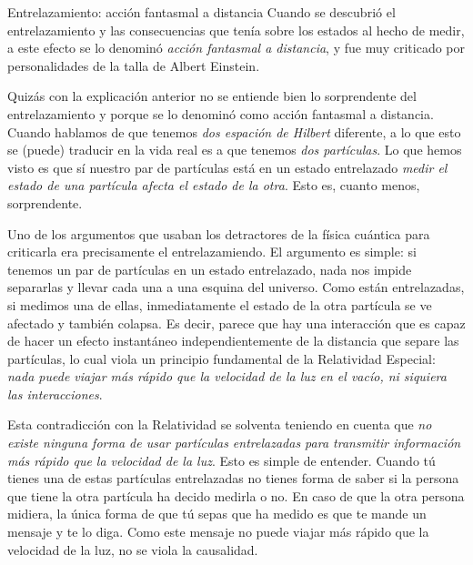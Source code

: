 \documentclass[a4paper,11pt]{book} %
\numberwithin{equation}{chapter}
\begin{document}
	\begin{mybox_blue}{Entrelazamiento: acción fantasmal a distancia}
	Cuando se descubrió el entrelazamiento y las consecuencias que tenía sobre los estados al hecho de medir, a este efecto se lo denominó
	\textit{acción fantasmal a distancia}, y fue muy criticado por personalidades de la talla de Albert Einstein. 
	
	\vspace{0.3cm}
	Quizás con la explicación anterior no se entiende bien lo sorprendente del entrelazamiento y porque se lo denominó como acción fantasmal a distancia.
	Cuando hablamos de que tenemos \textit{dos espación de Hilbert} diferente, a lo que esto se (puede) traducir en la vida real es a que tenemos \textit{dos partículas}.
	Lo que hemos visto es que sí nuestro par de partículas está en un estado entrelazado \textit{medir el estado de una partícula afecta el estado de la otra}. 
	Esto es, cuanto menos, sorprendente. 

	\vspace{0.3cm}	
	Uno de los argumentos que usaban los detractores de la física cuántica para criticarla era precisamente el entrelazamiendo. El argumento es simple: si tenemos un par de 
	partículas en un estado entrelazado, nada nos impide separarlas y llevar cada una a una esquina del universo. Como están entrelazadas, si medimos una de ellas, 
	inmediatamente el estado de la otra partícula se ve afectado y también colapsa. Es decir, parece que hay una interacción que es capaz de hacer un efecto instantáneo 
	independientemente de la distancia que separe las partículas, lo cual viola un principio fundamental de la Relatividad Especial: \textit{nada puede viajar más rápido que 
	la velocidad de la luz en el vacío, ni siquiera las interacciones}. 

	\vspace{0.3cm}	
	Esta contradicción con la Relatividad se solventa teniendo en cuenta que \textit{no existe ninguna forma de usar partículas entrelazadas para transmitir información más 
	rápido que la velocidad de la luz}. Esto es simple de entender. Cuando tú tienes una de estas partículas entrelazadas no tienes forma de saber si la persona que tiene la 
	otra partícula ha decido medirla o no. En caso de que la otra persona midiera, la única forma de que tú sepas que ha medido es que te mande un mensaje y te lo diga. 
	Como este mensaje no puede viajar más rápido que la velocidad de la luz, no se viola la causalidad. 
	\end{mybox_blue}
\end{document}
